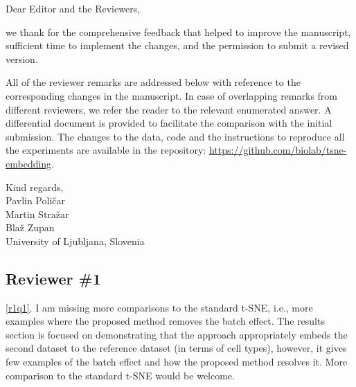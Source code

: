 \documentclass{article}
\newcounter{rtaskno}
\newcommand{\rtask}[1]{\refstepcounter{rtaskno}\label{#1}}
\newcommand{\reviewc}[2]{\begin{leftbar}\noindent\rtask{#1}\ref{#1}. #2\end{leftbar}}
\newlength{\leftbarwidth}
\newlength{\leftbarsep}
\renewenvironment{leftbar}{%
    \def\FrameCommand{{\color{black}{\vrule width \leftbarwidth\relax\hspace {\leftbarsep}}}}%
    \MakeFramed {\advance \hsize -\width \FrameRestore }%
}{\endMakeFramed}
\begin{document}

\vspace{5mm}

\vspace{5mm}


\noindent Dear Editor and the Reviewers, \\
 
\vspace{3mm}

\noindent we thank for the comprehensive feedback that helped to improve the
manuscript, sufficient time to implement the changes, and the permission to
submit a revised version. 
 
\vspace{3mm}

All of the reviewer remarks are addressed below with reference to the
corresponding changes in the manuscript.  In case of overlapping remarks from
different reviewers, we refer the reader to the relevant enumerated answer. A
differential document is provided to facilitate the comparison with the initial
submission. The changes to the data, code and the instructions to reproduce all
the experiments are available in the repository:
\url{https://github.com/biolab/tsne-embedding}.

\vspace{3mm}

\begin{flushright}
\noindent Kind regards, \\ 
\vspace{2mm}
Pavlin Poli\v{c}ar \\
Martin Stra\v{z}ar \\
Bla\v{z} Zupan \\ 
\vspace{2mm}
University of Ljubljana, Slovenia 
\end{flushright}

\vspace{10mm}


\subsection*{Reviewer \#1}

\reviewc{r1q1}{I am missing more comparisons to the standard t-SNE, i.e., more
examples where the proposed method removes the batch effect. The results
section is focused on demonstrating that the approach appropriately embeds the
second dataset to the reference dataset (in terms of cell types), however, it
gives few examples of the batch effect and how the proposed method resolves it.
More comparison to the standard t-SNE would be welcome.}
\end{document}
